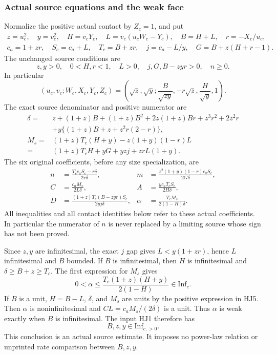 \subsubsection*{Actual source equations and the weak face}

Normalize the positive actual contact by \(Z_c=1\), and put
\[
\begin{gathered}
 z=u_c^2,\quad y=v_c^2,\quad H=v_cY_c,\quad
 L=v_c(u_cW_c-Y_c),\quad B=H+L,\quad r=-X_c/u_c,\\
 c_a=1+zr,\quad S_c=c_a+L,\quad T_c=B+zr,\quad
 j=c_a-L/y,\quad G=B+z(H+r-1).
\end{gathered}
\tag{HJ4}
\]
The unchanged source conditions are
\[
 z,y>0,\quad 0<H,r<1,\quad L>0,\quad
 j,G,B-zyr>0,\quad n\geq0 .
\]
In particular
\[
 (u_c,v_c;W_c,X_c,Y_c,Z_c)
 =\left(\sqrt z,\sqrt y;\frac{B}{\sqrt{zy}},
                  -r\sqrt z,\frac H{\sqrt y},1\right).
\]
The exact source denominator and positive numerator are
\[
\begin{split}
 \delta={}&z+(1+z)B+(1+z)B^2+2z(1+z)Br
                       +z^3r^2+2z^2r\\
 &+y\{(1+z)B+z+z^2r(2-r)\},\\
 M_s={}&(1+z)T_c(H+y)-z(1+y)(1-r)L\\
     ={}&(1+z)T_cH+yG+yzj+zrL(1+y).
\end{split}
\tag{HJ5}
\]
The six original coefficients, before any size specialization, are
\[
\begin{aligned}
 n&=\frac{T_cc_aS_c-r\delta}{2r\delta},&
 m&=\frac{z^2(1+y)(1-r)c_aS_c}{2G\delta},\\
 C&=\frac{c_aM_s}{2L\delta},&
 A&=\frac{yc_aT_cS_c}{2H\delta},\\
 D&=\frac{(1+z)T_c(B-zyr)S_c}{2yj\delta},&
 \alpha&=\frac{T_cM_s}{2(1-H)\delta}.
\end{aligned}
\tag{HJ6}
\]
All inequalities and all contact identities below refer
to these actual coefficients.  In particular the
numerator of \(n\) is never replaced by a limiting
source whose sign has not been proved.

Since \(z,y\) are infinitesimal, the exact \(j\) gap gives
\(L<y(1+zr)\), hence \(L\) infinitesimal and \(B\)
bounded.  If \(B\) is infinitesimal, then \(H\) is
infinitesimal and \(\delta\geq B+z\geq T_c\).
The first expression for \(M_s\) gives
\[
 0<\alpha
 \leq\frac{T_c(1+z)(H+y)}{2(1-H)}
 \in\mathrm{Inf}_c.
 \tag{HJ7}
\]
If \(B\) is a unit, \(H=B-L\), \(\delta\), and \(M_s\)
are units by the positive expression in HJ5.
Then \(\alpha\) is noninfinitesimal and
\(CL=c_aM_s/(2\delta)\) is a unit.
Thus \(\alpha\) is weak exactly when \(B\) is
infinitesimal.  The input HJ1 therefore has
\[
 B,z,y\in\mathrm{Inf}_{c,>0}.
 \tag{HJ8}
\]
This conclusion is an actual source estimate.
It imposes no power-law relation or unprinted rate
comparison between \(B,z,y\).


